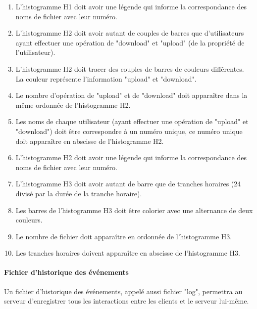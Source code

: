 \documentclass[10pt,a4paper]{report}
\begin{document}
\begin{enumerate}
			\item L'histogramme H1 doit avoir une légende qui informe la correspondance des noms de fichier avec leur numéro.
			\item L'histogramme H2 doit avoir autant de couples de barres que d'utilisateurs ayant effectuer une opération de "download" et "upload" (de la propriété de l'utilisateur).
			\item L'histogramme H2 doit tracer des couples de barres de couleurs différentes. La couleur représente l'information "upload" et "download".
			\item Le nombre d'opération de "upload" et de "download" doit apparaître dans la même ordonnée de l'histogramme H2.

			\item Les noms de chaque utilisateur (ayant effectuer une opération de "upload" et "download") doit être correspondre à un numéro unique, ce numéro unique doit apparaître en abscisse de l'histogramme H2.
			\item L'histogramme H2 doit avoir une légende qui informe la correspondance des noms de fichier avec leur numéro.
			\item L'histogramme H3 doit avoir autant de barre que de tranches horaires (24 divisé par la durée de la tranche horaire).
			\item Les barres de l'histogramme H3 doit être colorier avec une alternance de deux couleurs.

			\item Le nombre de fichier doit apparaître en ordonnée de l'histogramme H3.
			\item Les tranches horaires doivent apparaître en abscisse de l'histogramme H3.

		\end{enumerate}
		
\paragraph{Fichier d'historique des événements}

Un fichier d'historique des événements, appelé aussi fichier "log", permettra au serveur d'enregistrer tous les interactions entre les clients et le serveur lui-même.
\end{document}
